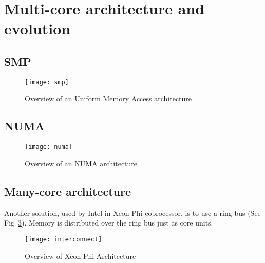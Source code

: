\section{Multi-core architecture and evolution}



\subsection{SMP}
\label{sec:smp}


\begin{figure}[!ht]
        \centering
        \texttt{[image: smp]}
        \caption{Overview of an Uniform Memory Access architecture}
        \label{fig:smp}
\end{figure}



\subsection{NUMA}
\begin{figure}[!ht]
  \centering
  \texttt{[image: numa]}
  \caption{Overview of an NUMA architecture}
  \label{fig:numa}
\end{figure}



\subsection{Many-core architecture}


Another solution, used by Intel in Xeon Phi coprocessor, is to use a ring bus (See Fig~\ref{fig:interconnect}).
%
Memory is distributed over the ring bus just as core units.
%

\begin{figure}[!ht]
  \centering
  \texttt{[image: interconnect]}
  \caption{Overview of Xeon Phi Architecture}
  \label{fig:interconnect}
\end{figure}
